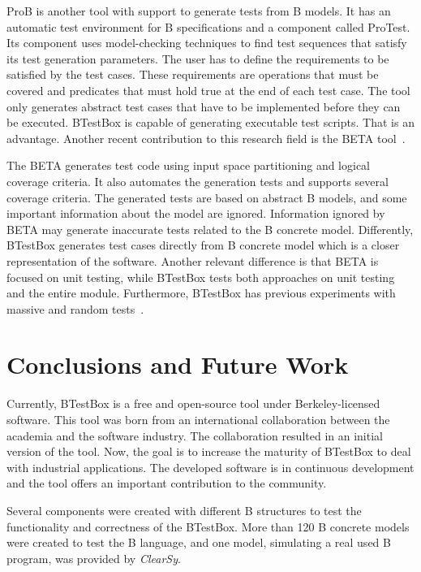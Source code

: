 \documentclass[runningheads]{llncs}
\begin{document}
ProB is another tool with support to generate tests from B models. It has an automatic test environment for B specifications and a component called ProTest.
Its component uses model-checking techniques to find test sequences that satisfy its test generation parameters. The user has to define the requirements to be satisfied by the test cases. These requirements are operations that must be covered and predicates that must hold true at the end of each test case. The tool only generates abstract test cases that have to be implemented before they can be executed. BTestBox is capable of generating executable test scripts. That is an advantage. Another recent contribution to this research field is the BETA tool~\cite{ernesto_thesis:2016}. 

The BETA generates test code using input space partitioning and logical coverage criteria. It also automates the generation tests and supports several coverage criteria. The generated tests are based on abstract B models, and some important information about the model are ignored.
Information ignored by BETA may generate inaccurate tests related to the B concrete model. Differently, BTestBox generates test cases directly from B concrete model which is a closer representation of the software.
Another relevant difference is that BETA is focused on unit testing, while BTestBox tests both approaches on unit testing and the entire module. Furthermore, BTestBox has previous experiments with massive and random tests~\cite{deharbebtestbox}.

\section{Conclusions and Future Work} \label{sec:Conclusion}


Currently, BTestBox is a free and open-source tool under Berkeley-licensed software.
This tool was born from an international collaboration between the academia and the software industry. The collaboration resulted in an initial version of the tool. Now, the goal is to increase the maturity of BTestBox to deal with industrial applications.
The developed software is in continuous development and the tool offers an important contribution to the community.

Several components were created with different B structures to test the functionality and correctness of the BTestBox. More than 120 B concrete models were created to test the B language, and one model, simulating a real used B program, was provided by \textit{ClearSy}.
\end{document}
